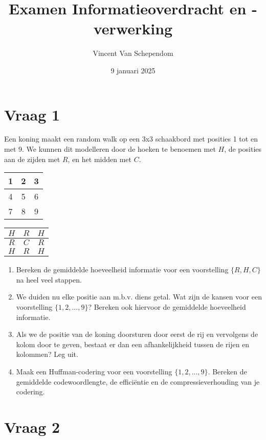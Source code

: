 \documentclass[kulak]{kulakarticle}
\title{Examen Informatieoverdracht en -verwerking}
\author{Vincent Van Schependom}
\date{9 januari 2025}
\begin{document}
	\maketitle

	\section*{Vraag 1}

	Een koning maakt een random walk op een 3x3 schaakbord met posities 1 tot en met 9. We kunnen dit modelleren door de hoeken te benoemen met \(H\), de posities aan de zijden met \(R\), en het midden met \(C\).

	\renewcommand{\arraystretch}{1.5}
	\begin{table}[h!]
		\centering
		\begin{tabular}{|c|c|c|}
			\hline
			1 & 2 & 3 \\
			\hline
			4 & 5 & 6 \\
			\hline
			7 & 8 & 9 \\
			\hline
		\end{tabular}
		\hspace{2cm}
		\begin{tabular}{|c|c|c|}
			\hline
			\(H\) & \(R\) & \(H\) \\
			\hline
			\(R\) & \(C\) & \(R\) \\
			\hline
			\(H\) & \(R\) & \(H\) \\
			\hline
		\end{tabular}
	\end{table}

	\begin{enumerate}
		\item Bereken de gemiddelde hoeveelheid informatie voor een voorstelling \(\{R,H,C\}\) na heel veel stappen.
		\item We duiden nu elke positie aan m.b.v. diens getal. Wat zijn de kansen voor een voorstelling \(\{1,2,...,9\}\)? Bereken ook hiervoor de gemiddelde hoeveelheid informatie.
		\item Als we de positie van de koning doorsturen door eerst de rij en vervolgens de kolom door te geven, bestaat er dan een afhankelijkheid tussen de rijen en kolommen? Leg uit.
		\item Maak een Huffman-codering voor een voorstelling \(\{1,2,...,9\}\). Bereken de gemiddelde codewoordlengte, de efficiëntie en de compressieverhouding van je codering.
	\end{enumerate}

	\section*{Vraag 2}
\end{document}
